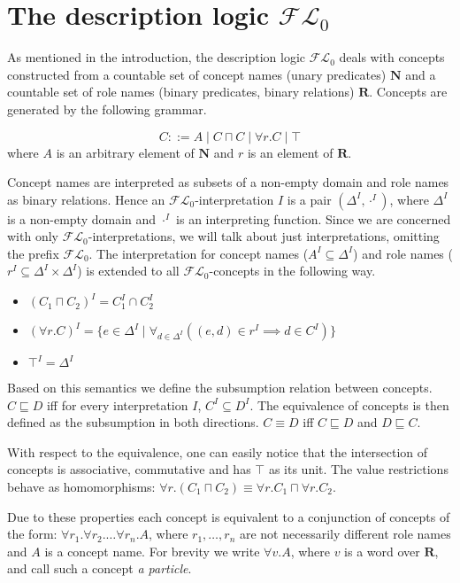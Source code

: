 \documentclass{article}
\newcommand{\flo}{\ensuremath{\mathcal{FL}_0}\xspace}
\newcommand{\roles}{\ensuremath{\mathbf{R}}\xspace}
\newcommand{\names}{\ensuremath{\mathbf{N}}\xspace}
\begin{document}
	\section{The description logic \flo}
	As mentioned in the introduction, the description logic \flo deals with concepts constructed
	from a countable set of concept names (unary predicates) \names and a countable set of role names (binary predicates, binary relations) \roles.
	Concepts are generated by the following grammar.
	
	\[ C ::= A \mid C \sqcap C \mid \forall r.C \mid \top \]
	where $A$ is an arbitrary element of \names and $r$ is an element of \roles.
	
	Concept names are interpreted as subsets of a non-empty domain and role names as binary relations.
	Hence an \flo-interpretation $I$ is a pair $(\Delta^I, \cdot^I)$, where $\Delta^I$ is a non-empty domain
	and $\cdot^I$ is an interpreting function. Since we are concerned with only \flo-interpretations, we will talk about just interpretations, omitting the prefix $\flo$.
	 The interpretation for concept names ($A^I \subseteq \Delta^I$) and role names ($r^I \subseteq \Delta^I \times \Delta^I$) is extended
	to all \flo-concepts in the following way.
	
	\begin{itemize}
		\item $(C_1 \sqcap C_2)^I = C_1^I \cap C_2^I$
		\item $(\forall r.C)^I = \{e \in \Delta^I \mid \forall_{d \in \Delta^I} ((e,d) \in r^I \implies d \in C^I)\}$
		\item $\top^I = \Delta^I$
	\end{itemize}

Based on this semantics we define the subsumption relation between concepts.
$C \sqsubseteq D$ iff for every interpretation $I$, $C^I \subseteq D^I$.
The equivalence of concepts is then defined as the subsumption in both directions.
$C \equiv D$ iff $C\sqsubseteq D$ and $D \sqsubseteq C$.	
	
With respect to the equivalence, one can easily notice that the intersection of concepts is associative,
commutative and has $\top$ as its unit. The value restrictions behave as homomorphisms:
$\forall r.(C_1 \sqcap C_2) \equiv \forall r.C_1 \sqcap \forall r.C_2$.

Due to these properties each concept is equivalent to a conjunction of concepts of the form:
$\forall r_1.\forall r_2. \dots \forall r_n. A$, where $r_1, \dots, r_n$ are not necessarily different role names and $A$ is a concept name. For brevity we write $\forall v.A$, where $v$ is a word over \roles, 
and call such a concept \emph{a particle}.
\end{document}
